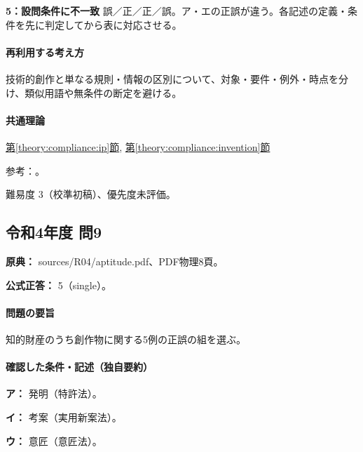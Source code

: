 \noindent\textbf{5：設問条件に不一致} 誤／正／正／誤。ア・エの正誤が違う。各記述の定義・条件を先に判定してから表に対応させる。\par

\paragraph{再利用する考え方} 技術的創作と単なる規則・情報の区別について、対象・要件・例外・時点を分け、類似用語や無条件の断定を避ける。

\paragraph{共通理論} \hyperref[theory:compliance:ip]{第\ref*{theory:compliance:ip}節}, \hyperref[theory:compliance:invention]{第\ref*{theory:compliance:invention}節}

\par 参考：\cite{ip_basic_act,jpo_patent_utility,jpo_invention_criteria}。

\par 難易度 3（校準初稿）、優先度未評価。

\subsection{令和4年度 問9}
\label{q:r04-reg-apt-09}

\noindent\textbf{原典：} sources/R04/aptitude.pdf、PDF物理8頁。

\textbf{公式正答：} 5（single）。

\paragraph{問題の要旨} 知的財産のうち創作物に関する5例の正誤の組を選ぶ。

\paragraph{確認した条件・記述（独自要約）}\mbox{}\par

\noindent\textbf{ア：} 発明（特許法）。\par

\noindent\textbf{イ：} 考案（実用新案法）。\par

\noindent\textbf{ウ：} 意匠（意匠法）。\par

